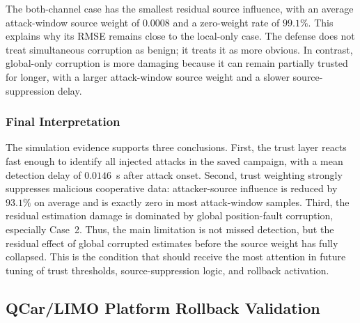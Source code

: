 \documentclass[journal,twoside]{IEEEtran}
\begin{document}
The both-channel case has the smallest residual source influence, with an average attack-window source weight of $0.0008$ and a zero-weight rate of $99.1\%$. This explains why its RMSE remains close to the local-only case. The defense does not treat simultaneous corruption as benign; it treats it as more obvious. In contrast, global-only corruption is more damaging because it can remain partially trusted for longer, with a larger attack-window source weight and a slower source-suppression delay.

\subsubsection{Final Interpretation}

The simulation evidence supports three conclusions. First, the trust layer reacts fast enough to identify all injected attacks in the saved campaign, with a mean detection delay of $0.0146$~s after attack onset. Second, trust weighting strongly suppresses malicious cooperative data: attacker-source influence is reduced by $93.1\%$ on average and is exactly zero in most attack-window samples. Third, the residual estimation damage is dominated by global position-fault corruption, especially Case~2. Thus, the main limitation is not missed detection, but the residual effect of global corrupted estimates before the source weight has fully collapsed. This is the condition that should receive the most attention in future tuning of trust thresholds, source-suppression logic, and rollback activation.



\subsection{QCar/LIMO Platform Rollback Validation}\label{sec:qcar_limo_platform}
\end{document}
